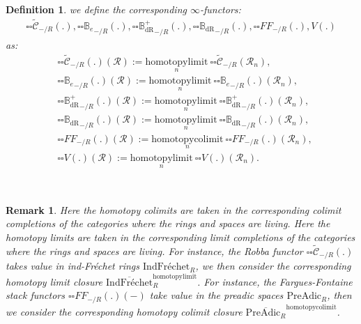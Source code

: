 \documentclass[12pt]{book}
\newtheorem{remark}{Remark}
\newtheorem{definition}{Definition}
\begin{document}
\begin{definition}
we define the corresponding $\infty$-functors:
\begin{align}
{\square\square}\widetilde{\mathcal{C}}_{-/R}(.),{\square\square}{\mathbb{B}_e}_{-/R}(.),{\square\square}{\mathbb{B}_\mathrm{dR}^+}_{-/R}(.),{\square\square}{\mathbb{B}_\mathrm{dR}}_{-/R}(.),{\square\square}{FF}_{-/R}(.),V(.)	
\end{align}
as:
\begin{align}
&{\square\square}\widetilde{\mathcal{C}}_{-/R}(.)(\mathcal{R}):=\underset{n}{\mathrm{homotopylimit}}~{\square\square}\widetilde{\mathcal{C}}_{-/R}(\mathcal{R}_n),\\
&{\square\square}{\mathbb{B}_e}_{-/R}(.)(\mathcal{R}):=\underset{n}{\mathrm{homotopylimit}}~{\square\square}{\mathbb{B}_e}_{-/R}(.)(\mathcal{R}_n),\\
&{\square\square}{\mathbb{B}_\mathrm{dR}^+}_{-/R}(.)(\mathcal{R}):=\underset{n}{\mathrm{homotopylimit}}~{\square\square}{\mathbb{B}_\mathrm{dR}^+}_{-/R}(.)(\mathcal{R}_n),\\
&{\square\square}{\mathbb{B}_\mathrm{dR}}_{-/R}(.)(\mathcal{R}):=\underset{n}{\mathrm{homotopylimit}}~{\square\square}{\mathbb{B}_\mathrm{dR}}_{-/R}(.)(\mathcal{R}_n),\\
&{\square\square}{{FF}}_{-/R}(.)(\mathcal{R}):=\underset{n}{\mathrm{homotopycolimit}}~{\square\square}{{FF}}_{-/R}(.)(\mathcal{R}_n),\\	
&{\square\square}V(.)(\mathcal{R}):=\underset{n}{\mathrm{homotopylimit}}~{\square\square}V(.)(\mathcal{R}_n).
\end{align}
\end{definition}

\

\begin{remark}
Here the homotopy colimits are taken in the corresponding colimit completions of the categories where the rings and spaces are living. Here the homotopy limits are taken in the corresponding limit completions of the categories where the rings and spaces are living. For instance, the Robba functor ${\square\square}\widetilde{\mathcal{C}}_{-/R}(.)$ takes value in ind-Fr\'echet rings $\mathrm{Ind}\text{Fr\'echet}_R$, we then consider the corresponding homotopy limit closure $\overline{\mathrm{Ind}\text{Fr\'echet}}^{\mathrm{homotopylimit}}_R$. For instance, the Fargues-Fontaine stack functors ${\square\square}{{FF}}_{-/R}(.)(-)$ take value in the preadic spaces $\mathrm{PreAdic}_R$, then we consider the corresponding homotopy colimit closure $\overline{\mathrm{PreAdic}_R}^{\mathrm{homotopycolimit}}$. 	
\end{remark}
\end{document}
